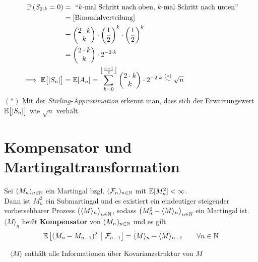 \begin{beisp}
\begin{align*}
		\mathbb{P}\left(S_{2\cdot k}=0\right)&=\text{ ``$k$-mal Schritt nach oben, $k$-mal Schritt nach unten''}\\
		&=[\text{Binomialverteilung]}\\
		&=\begin{pmatrix}
			2\cdot k\\ k
		\end{pmatrix}\cdot\left(\frac{1}{2}\right)^k\cdot\left(\frac{1}{2}\right)^k\\
		&=\begin{pmatrix}
			2\cdot k \\ k
		\end{pmatrix}\cdot 2^{-2\cdot k}\\
		\implies
		\mathbb{E}\big[|S_n|\big]&=\mathbb{E}[A_n]=\sum\limits_{k=0}^{\left\lfloor\frac{n-1}{2}\right\rfloor}\begin{pmatrix}
			2\cdot k\\ k
		\end{pmatrix}\cdot 2^{-2\cdot k}\stackrel{(\ast)}{\sim}\sqrt{n}
	\end{align*}
	$(\ast)$ Mit der \textit{Stirling-Approximation} erkennt man, dass sich der Erwartungswert $\mathbb{E}\big[|S_n|\big]$ wie $\sqrt{n}$ verhält.
\end{beisp}

\section{Kompensator und Martingaltransformation} %
\setcounter{satz}{3}
\begin{lemma}\label{lemma2.4}
	Sei $(M_n)_{n\in\mathbb{N}}$ ein Martingal bzgl. $(\mathcal{F}_n)_{n\in\mathbb{N}}$ mit $\mathbb{E}[M_n^2]<\infty$.\\
	Dann ist $M_n^2$ ein Submartingal und es existiert ein eindeutiger steigender vorhersehbarer Prozess $\big(\langle M\rangle_n\big)_{n\in\mathbb{N}}$, sodass $\big(M_n^2-\langle M\rangle_n\big)_{n\in\mathbb{N}}$ ein Martingal ist.
	$\langle M\rangle_n$ heißt \textbf{Kompensator} von $(M_n)_{n\in\mathbb{N}}$ und es gilt
	\begin{align}\label{eqLemma2.4}
		\mathbb{E}\left[(M_n-M_{n-1})^2~\big|~\mathcal{F}_{n-1}\right]=\langle M\rangle_n-\langle M\rangle_{n-1}\qquad\forall n\in\mathbb{N}
	\end{align}
\end{lemma}

\begin{bemerkung}\ %
	$\langle M\rangle$ enthält alle Informationen über Kovarianzstruktur von $M$
\end{bemerkung}

